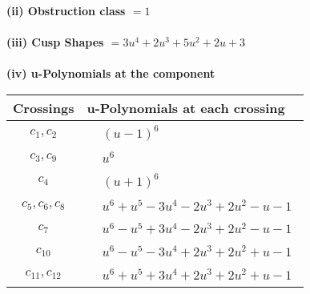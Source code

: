 \documentclass[1p]{elsarticle_modified}
\theoremstyle{definition}
\begin{document}
\flushleft \textbf{(ii) Obstruction class $= 1$}\\~\\
\flushleft \textbf{(iii) Cusp Shapes $= 3 u^4+2 u^3+5 u^2+2 u+3$}\\~\\
\newpage\renewcommand{\arraystretch}{1}
\flushleft \textbf{(iv) u-Polynomials at the component}\newline \\
\begin{tabular}{m{50pt}|m{274pt}}
Crossings & \hspace{64pt}u-Polynomials at each crossing \\
\hline $$\begin{aligned}c_{1},c_{2}\end{aligned}$$&$\begin{aligned}
&(u-1)^6
\end{aligned}$\\
\hline $$\begin{aligned}c_{3},c_{9}\end{aligned}$$&$\begin{aligned}
&u^6
\end{aligned}$\\
\hline $$\begin{aligned}c_{4}\end{aligned}$$&$\begin{aligned}
&(u+1)^6
\end{aligned}$\\
\hline $$\begin{aligned}c_{5},c_{6},c_{8}\end{aligned}$$&$\begin{aligned}
&u^6+u^5-3 u^4-2 u^3+2 u^2- u-1
\end{aligned}$\\
\hline $$\begin{aligned}c_{7}\end{aligned}$$&$\begin{aligned}
&u^6- u^5+3 u^4-2 u^3+2 u^2- u-1
\end{aligned}$\\
\hline $$\begin{aligned}c_{10}\end{aligned}$$&$\begin{aligned}
&u^6- u^5-3 u^4+2 u^3+2 u^2+u-1
\end{aligned}$\\
\hline $$\begin{aligned}c_{11},c_{12}\end{aligned}$$&$\begin{aligned}
&u^6+u^5+3 u^4+2 u^3+2 u^2+u-1
\end{aligned}$\\
\hline
\end{tabular}\\~\\
\end{document}
